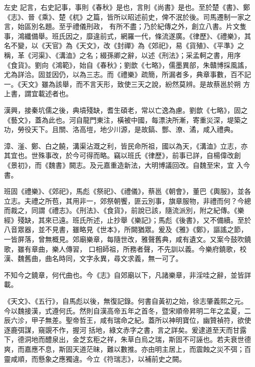 
\begin{pinyinscope}

 左史
 記言，右史記事，事則《春秋》是也，言則《尚書》是也。至於楚《書》、鄭《志》、晉《乘》、楚《杌》之篇，皆所以昭述前史，俾不泯於後。司馬遷制一家之言，始區別名題。至乎禮儀刑政，
 有所不盡；乃於紀傳之外，創立八書。片文隻事，鴻纖備舉。班氏因之，靡違前式，網羅一代，條流遂廣。《律歷》、《禮樂》，其名不變，以《天官》為《天文》，改《封禪》為《郊祀》，易《貨殖》、《平準》之稱，革《河渠》、《溝洫》之名；綴孫卿之辭，以述《刑法》；采孟軻之書，用序《食貨》。劉向《鴻範》，始自《春秋》；劉歆《七略》，儒墨異部，朱贛博採風謠，尤為詳洽。固並因仍，以為三志。而《禮樂》疏簡，所漏者多，典章事數，百不記一。《天文》雖為該舉，而不言天形，致使三天之說，紛然莫辨。是故蔡邕於朔
 方上書，謂宜載述者也。



 漢興，接秦坑儒之後，典墳殘缺，耆生碩老，常以亡逸為慮。劉歆《七略》，固之《藝文》，蓋為此也。河自龍門東注，橫被中國，每漂決所漸，寄重災深，堤築之功，勞役天下。且關、洛高塏，地少川源，是故鎬、酆、潦、潏，咸入禮典。



 漳、滏、鄭、白之饒，溝渠沾溉之利，皆民命所祖，國以為天，《溝洫》立志，亦其宜也。世殊事改，於今可得而略。竊以班氏《律歷》，前事已詳，自楊偉改創《景初》，而《魏書》闕志。及元嘉重造新法，大明博議回改。自魏至宋，宜
 入今書。



 班固《禮樂》、《郊祀》，馬彪《祭祀》、《禮儀》，蔡邕《朝會》，董巴《輿服》，並各立志。夫禮之所苞，其用非一，郊祭朝饗，匪云別事，旗章服物，非禮而何？今總而裁之，同謂《禮志》。《刑法》、《食貨》，前說已該，隨流派別，附之紀傳。《樂經》殘缺，其來已遠。班氏所述，止抄舉《樂記》；馬彪《後書》，又不備續。至於八音眾器，並不見書，雖略見《世本》，所闕猶眾。爰及《雅》《鄭》，謳謠之節，一皆屏落，曾無概見。郊廟樂章，每隨世改，雅聲舊典，咸有遺文。又案今鼓吹鐃歌，雖有章曲，樂人傳習，
 口相師祖，所務者聲，不先訓以義。今樂府鐃歌，校漢、魏舊曲，曲名時同，文字永異，尋文求義，無一可了。



 不知今之鐃章，何代曲也。今《志》自郊廟以下，凡諸樂章，非淫哇之辭，並皆詳載。



 《天文》、《五行》，自馬彪以後，無復記錄。何書自黃初之始，徐志肇義熙之元。今以魏接漢，式遵何氏。然則自漢高帝五年之首冬，暨宋順帝昇明二年之孟夏，二辰六沴，甲子無差。聖帝哲王，咸有瑞命之紀。蓋所以神明寶位，幽贊禎符，欲使逐鹿弭謀，窺覬不作，握河
 括地，綠文赤字之書，言之詳矣。爰逮道至天而甘露下，德洞地而醴泉出，金芝玄秬之祥，朱草白烏之瑞，斯固不可誣也。若夫衰世德爽，而嘉應不息，斯固天道茫昧，難以數推。亦由明主居上，而震蝕之災不弭；百靈咸順，而懸象之應獨違。今立《符瑞志》，以補前史之闕。




\end{pinyinscope}
